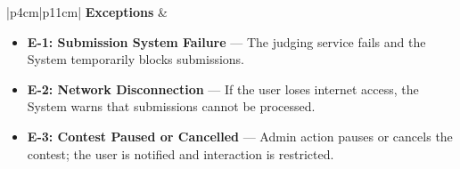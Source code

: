 \begin{longtable}{|p{4cm}|p{11cm}|}
\textbf{Exceptions} &
\begin{minipage}[t]{\linewidth}
\begin{itemize}[nosep, leftmargin=*]
\setlength\itemsep{0pt}
\setlength\topsep{0pt}
\setlength\partopsep{0pt}
\setlength\parsep{0pt}
    \item \textbf{E-1: Submission System Failure} — The judging service fails and the System temporarily blocks submissions.
    \item \textbf{E-2: Network Disconnection} — If the user loses internet access, the System warns that submissions cannot be processed.
    \item \textbf{E-3: Contest Paused or Cancelled} — Admin action pauses or cancels the contest; the user is notified and interaction is restricted.
\end{itemize}
\vspace{2pt}
\end{minipage}
\\ \hline

\caption{UC-9: Participate in a Contest}
\end{longtable}
